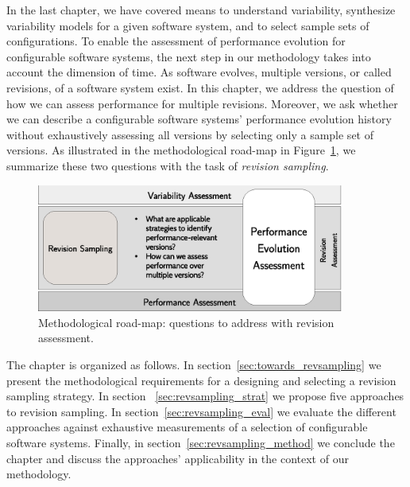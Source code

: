 In the last chapter, we have covered means to understand variability,
synthesize variability models for a given software system, and to select sample
sets of configurations. To enable the assessment of performance evolution for
configurable software systems, the next step in our methodology takes into
account the dimension of time. As software evolves, multiple versions, or
called revisions, of a software system exist. In this chapter, we address the
question of how we can assess performance for multiple revisions. Moreover, we
ask whether we can describe a configurable software systems’ performance
evolution history without exhaustively assessing all versions by selecting only
a sample set of versions. As illustrated in the methodological road-map in
Figure~\ref{fig:roadmap_2}, we summarize these two questions with the task of
\emph{revision sampling}.

\begin{figure}[h!]
	\centering
	\includegraphics[width=0.9\textwidth]{images/process_revassesment.eps}
	\caption{Methodological road-map: questions to address with revision
	assessment.}
	\label{fig:roadmap_2}
\end{figure}

The chapter is organized as follows. In section~\ref{sec:towards_revsampling} we
present the methodological requirements for a designing and selecting a revision sampling
strategy. In section ~\ref{sec:revsampling_strat} we propose five approaches to
revision sampling. In
section~\ref{sec:revsampling_eval} we evaluate the different approaches against
exhaustive measurements of a selection of configurable software systems.
Finally, in section~\ref{sec:revsampling_method} we conclude the chapter and
discuss the approaches' applicability in the context of our methodology.

